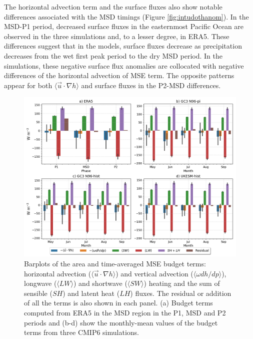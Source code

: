 
The horizontal advection term and the surface fluxes also show notable differences associated with the MSD timings (Figure \ref{fig:intudothanom}). In the MSD-P1 period, decreased surface fluxes in the easternmost Pacific Ocean are observed in the three simulations and, to a lesser degree, in ERA5. These differences suggest that in the models, surface fluxes decrease as precipitation decreases from the wet first peak period to the dry MSD period. In the simulations, these negative surface flux anomalies are collocated with negative differences of the horizontal advection of MSE term. 
The opposite patterns appear for both $\langle \vec{u}\cdot\nabla h \rangle$ and surface fluxes in the P2-MSD differences.


\begin{figure}[t!]
\includegraphics[width=\linewidth]{figures/mse_barplot_era5}
\caption[Barplots of MSE budget terms]{Barplots of the area and time-averaged MSE budget terms: horizontal advection ($\langle \vec{u}\cdot\nabla h \rangle$) and vertical advection ($\langle \omega dh/dp \rangle$), longwave ($\langle LW \rangle$) and shortwave ($\langle SW \rangle$) heating and the sum of sensible ($SH$) and latent heat ($LH$) fluxes. The residual or addition of all the terms is also shown in each panel. (a) Budget terms computed from ERA5 in the MSD region in the P1, MSD and P2 periods and (b-d) show the monthly-mean values of the budget terms from three CMIP6 simulations. }
\label{fig:thermo_barplot}
\end{figure}

